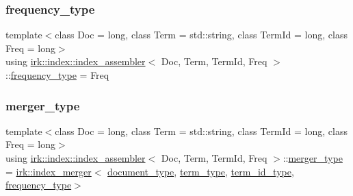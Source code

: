 \mbox{\label{classirk_1_1index_1_1index__assembler_a8da91d64fb4a68136f7978944e7f3373}} 
\subsubsection{\texorpdfstring{frequency\+\_\+type}{frequency\_type}}
{\footnotesize\ttfamily template$<$class Doc  = long, class Term  = std\+::string, class Term\+Id  = long, class Freq  = long$>$ \\
using \mbox{\hyperlink{classirk_1_1index_1_1index__assembler}{irk\+::index\+::index\+\_\+assembler}}$<$ Doc, Term, Term\+Id, Freq $>$\+::\mbox{\hyperlink{classirk_1_1index_1_1index__assembler_a8da91d64fb4a68136f7978944e7f3373}{frequency\+\_\+type}} =  Freq}

\mbox{\label{classirk_1_1index_1_1index__assembler_a059327e71e4de55d8b5872b7775399ed}} 
\subsubsection{\texorpdfstring{merger\+\_\+type}{merger\_type}}
{\footnotesize\ttfamily template$<$class Doc  = long, class Term  = std\+::string, class Term\+Id  = long, class Freq  = long$>$ \\
using \mbox{\hyperlink{classirk_1_1index_1_1index__assembler}{irk\+::index\+::index\+\_\+assembler}}$<$ Doc, Term, Term\+Id, Freq $>$\+::\mbox{\hyperlink{classirk_1_1index_1_1index__assembler_a059327e71e4de55d8b5872b7775399ed}{merger\+\_\+type}} =  \mbox{\hyperlink{classirk_1_1index__merger}{irk\+::index\+\_\+merger}}$<$ \mbox{\hyperlink{classirk_1_1index_1_1index__assembler_a42424117b672fc1383b3be13f3338bc4}{document\+\_\+type}}, \mbox{\hyperlink{classirk_1_1index_1_1index__assembler_a1dec315f145c0e887e0035c3b7f23235}{term\+\_\+type}}, \mbox{\hyperlink{classirk_1_1index_1_1index__assembler_ad632345d29f93e9f10fbc7e91db41f77}{term\+\_\+id\+\_\+type}}, \mbox{\hyperlink{classirk_1_1index_1_1index__assembler_a8da91d64fb4a68136f7978944e7f3373}{frequency\+\_\+type}}$>$}

